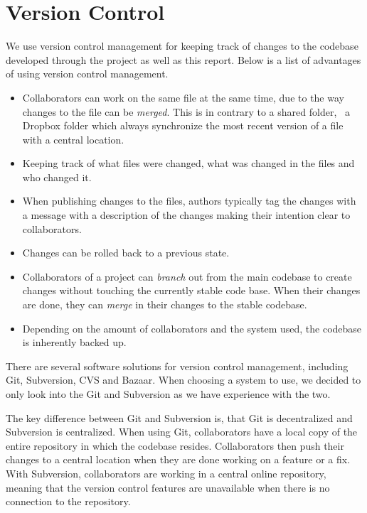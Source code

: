 \section{Version Control}
\label{sec:implementation:version-control}

We use version control management for keeping track of changes to the codebase developed through the project as well as this report. Below is a list of advantages of using version control management.

\begin{itemize}
\item Collaborators can work on the same file at the same time, due to the way changes to the file can be \emph{merged}. This is in contrary to a shared folder, \eg~a Dropbox folder which always synchronize the most recent version of a file with a central location.
\item Keeping track of what files were changed, what was changed in the files and who changed it.
\item When publishing changes to the files, authors typically tag the changes with a message with a description of the changes making their intention clear to collaborators.
\item Changes can be rolled back to a previous state.
\item Collaborators of a project can \emph{branch} out from the main codebase to create changes without touching the currently stable code base. When their changes are done, they can \emph{merge} in their changes to the stable codebase.
\item Depending on the amount of collaborators and the system used, the codebase is inherently backed up.
\end{itemize}

There are several software solutions for version control management, including Git, Subversion, CVS and Bazaar. When choosing a system to use, we decided to only look into the Git and Subversion as we have experience with the two.

The key difference between Git and Subversion is, that Git is decentralized and Subversion is centralized. When using Git, collaborators have a local copy of the entire repository in which the codebase resides. Collaborators then push their changes to a central location when they are done working on a feature or a fix. With Subversion, collaborators are working in a central online repository, meaning that the version control features are unavailable when there is no connection to the repository.

